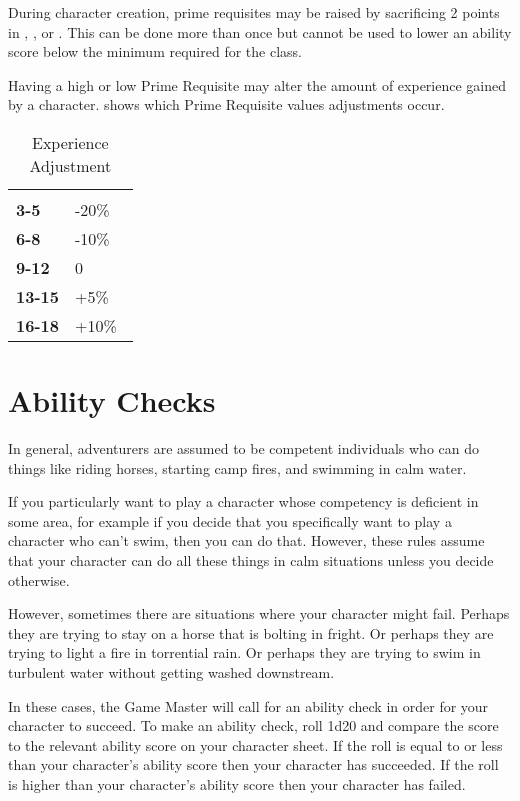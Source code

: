 \begin{multicols*}{2}
During character creation, prime requisites may be raised by sacrificing 2 points in , , or . This can be done more than once but cannot be used to lower an ability score below the minimum required for the class.

Having a high or low Prime Requisite may alter the amount of experience gained by a character.  shows which Prime Requisite values adjustments occur.

\begin {table}[H]
  \caption{Experience Adjustment}\label{tab:Experience Adjustment}
  \begin{tabularx}{\columnwidth}{>{\bfseries}YY}
		 & \\
		3-5 & -20\%\\
		6-8 & -10\%\\
		9-12 & 0\\
		13-15 & +5\%\\
		16-18 & +10\%\
  \end {tabularx}
\end {table}

\section{Ability Checks}\label{sec:Ability Checks}
In general, adventurers are assumed to be competent individuals who can do things like riding horses, starting camp fires, and swimming in calm water.

If you particularly want to play a character whose competency is deficient in some area, for example if you decide that you specifically want to play a character who can’t swim, then you can do that. However, these rules assume that your character can do all these things in calm situations unless you decide otherwise.

However, sometimes there are situations where your character might fail. Perhaps they are trying to stay on a horse that is bolting in fright. Or perhaps they are trying to light a fire in torrential rain. Or perhaps they are trying to swim in turbulent water without getting washed downstream.

In these cases, the Game Master will call for an ability check in order for your character to succeed. To make an ability check, roll 1d20 and compare the score to the relevant ability score on your character sheet. If the roll is equal to or less than your character’s ability score then your character has succeeded. If the roll is higher than your character’s ability score then your character has failed.


\end{multicols*}
